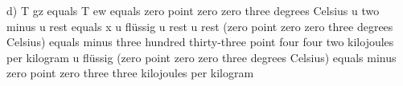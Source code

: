 d) T gz equals T ew equals zero point zero zero three degrees Celsius  
u two minus u rest equals x  
u flüssig u rest  
u rest (zero point zero zero three degrees Celsius) equals minus three hundred thirty-three point four four two kilojoules per kilogram  
u flüssig (zero point zero zero three degrees Celsius) equals minus zero point zero three three kilojoules per kilogram